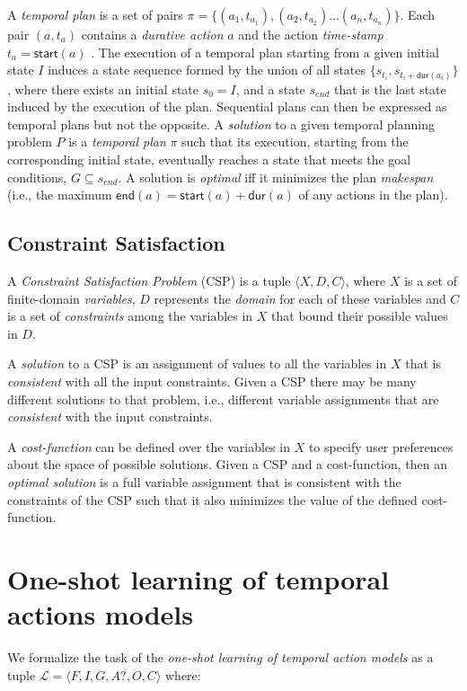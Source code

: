 \documentclass{ecai}
\newcommand{\tup}[1]{{\langle #1 \rangle}}
\newcommand{\dur}{\mathsf{dur}}    %
\newcommand{\start}{\mathsf{start}}%
\newcommand{\en}{\mathsf{end}}     %
\begin{document}
A {\em temporal plan} is a set of pairs $\pi=\{(a_1,t_{a_1}),(a_2,t_{a_2})\ldots (a_n,t_{a_n})\}$. Each pair $(a,t_a)$ contains a {\em durative action} $a$ and the action {\em time-stamp} $t_a=\start(a)$ . The execution of a temporal plan starting from a given initial state $I$ induces a state sequence formed by the union of all states $\{s_{t_i}, s_{t_i+\dur(a_i)}\}$, where there exists an initial state $s_{0}=I$, and a state $s_{end}$ that is the last state induced by the execution of the plan. Sequential plans can then be expressed as temporal plans but not the opposite. A {\em solution} to a given temporal planning problem $P$ is a {\em temporal plan} $\pi$ such that its execution, starting from the corresponding initial state, eventually reaches a state that meets the goal conditions, $G\subseteq s_{end}$. A solution is {\em optimal} iff it minimizes the plan {\em makespan} (i.e., the maximum $\en(a)=\start(a)+\dur(a)$ of any actions in the plan).

\subsection{Constraint Satisfaction}
A {\em Constraint Satisfaction Problem} (CSP) is a tuple $\tup{X,D,C}$, where $X$ is a set of finite-domain {\em variables}, $D$ represents the {\em domain} for each of these variables and $C$ is a set of {\em constraints} among the variables in $X$ that bound their possible values in $D$.

A {\em solution} to a CSP is an assignment of values to all the variables in $X$ that is {\em consistent} with all the input constraints. Given a CSP there may be many different solutions to that problem, i.e., different variable assignments that are {\em consistent} with the input constraints.

A {\em cost-function} can be defined over the variables in $X$ to specify user preferences about the space of possible solutions. Given a CSP and a cost-function, then an {\em optimal solution} is a full variable assignment that is consistent with the constraints of the CSP such that it also minimizes the value of the defined cost-function.



\section{One-shot learning of temporal actions models}
\label{section:learningTemporalModels}
We formalize the task of the {\em one-shot learning of temporal action models} as a tuple $\mathcal{L}=\tup{F,I,G,A?,O,C}$ where:
\end{document}
